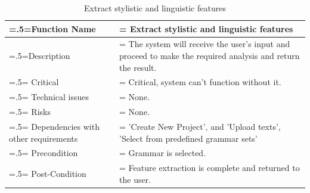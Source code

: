 \begin{center}
    \begin{table}[H]
        \caption{Extract stylistic and linguistic features}
        \begin{tabularx}{\textwidth} {
                | >{\raggedright\arraybackslash\hsize=.5\hsize\linewidth=\hsize}X
                | >{\raggedright\arraybackslash\hsize=1.5\hsize\linewidth=\hsize}X |}
            \hline
            Function Name                        & Extract stylistic and linguistic features                                                                 \\ \hline
            Description                          & The system will receive the user's input and proceed to make the required analysis and return the result. \\ \hline
            Critical                             & Critical, system can't function without it.                                                               \\ \hline
            Technical issues                     & None.                                                                                                     \\ \hline
            Risks                                & None.                                                                                                     \\ \hline
            Dependencies with other requirements & 'Create New Project', and 'Upload texts', 'Select from predefined grammar sets'                           \\ \hline
            Precondition                         & Grammar is selected.                                                                                      \\ \hline
            Post-Condition                       & Feature extraction is complete and returned to the user.                                                  \\ \hline
        \end{tabularx}
    \end{table}
\end{center}

